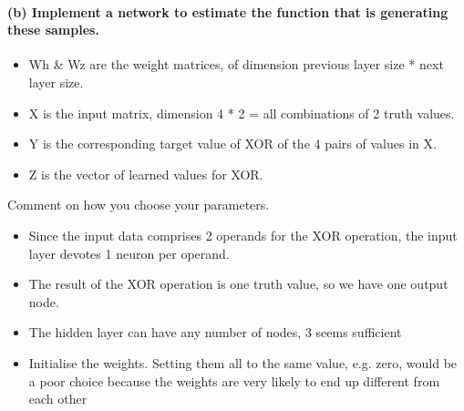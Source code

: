 \documentclass[11pt]{article}
\providecommand{\tightlist}{%
      \setlength{\itemsep}{0pt}\setlength{\parskip}{0pt}}
\begin{document}
    \paragraph{(b) Implement a network to estimate the function that is
generating these
samples.}\label{b-implement-a-network-to-estimate-the-function-that-is-generating-these-samples.}

\begin{itemize}
\tightlist
\item
  Wh \& Wz are the weight matrices, of dimension previous layer size *
  next layer size.
\item
  X is the input matrix, dimension 4 * 2 = all combinations of 2 truth
  values.
\item
  Y is the corresponding target value of XOR of the 4 pairs of values in
  X.
\item
  Z is the vector of learned values for XOR.
\end{itemize}

Comment on how you choose your parameters.

\begin{itemize}
\tightlist
\item
  Since the input data comprises 2 operands for the XOR operation, the
  input layer devotes 1 neuron per operand.
\item
  The result of the XOR operation is one truth value, so we have one
  output node.
\item
  The hidden layer can have any number of nodes, 3 seems sufficient
\item
  Initialise the weights. Setting them all to the same value, e.g. zero,
  would be a poor choice because the weights are very likely to end up
  different from each other
\end{itemize}
\end{document}
